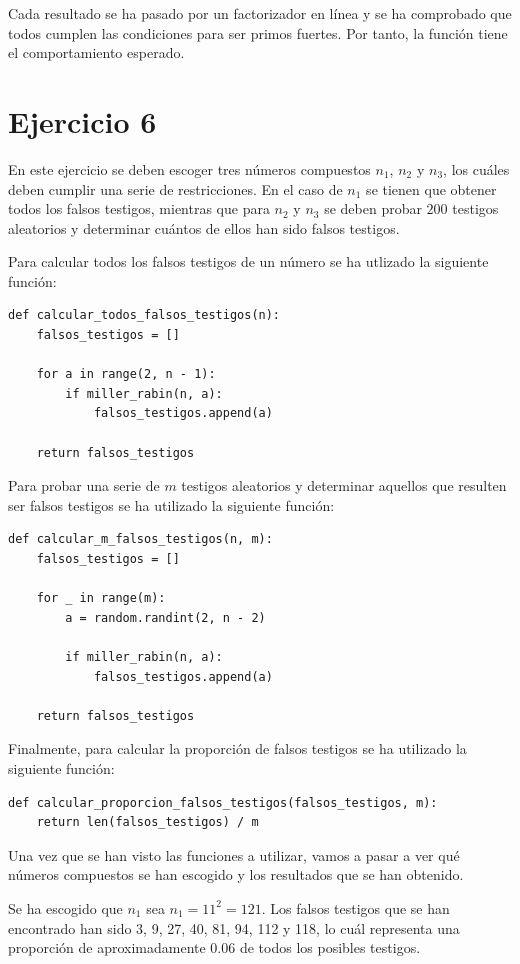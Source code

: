 \documentclass[11pt,a4paper]{article}
\newcommand{\nonumsection}[1]{\section*{#1}\addcontentsline{toc}{section}{#1}}
\begin{document}
Cada resultado se ha pasado por un factorizador en línea y se ha comprobado que todos cumplen
las condiciones para ser primos fuertes. Por tanto, la función tiene el comportamiento esperado. 

\nonumsection{Ejercicio 6}

En este ejercicio se deben escoger tres números compuestos $n_1$, $n_2$ y $n_3$, los cuáles
deben cumplir una serie de restricciones. En el caso de $n_1$ se tienen que obtener todos los
falsos testigos, mientras que para $n_2$ y $n_3$ se deben probar $200$ testigos aleatorios
y determinar cuántos de ellos han sido falsos testigos.

Para calcular todos los falsos testigos de un número se ha utlizado la siguiente
función:

\begin{lstlisting}
def calcular_todos_falsos_testigos(n):
    falsos_testigos = []

    for a in range(2, n - 1):
        if miller_rabin(n, a):
            falsos_testigos.append(a)
    
    return falsos_testigos
\end{lstlisting}

Para probar una serie de $m$ testigos aleatorios y determinar aquellos que resulten ser falsos
testigos se ha utilizado la siguiente función:

\begin{lstlisting}
def calcular_m_falsos_testigos(n, m):
    falsos_testigos = []

    for _ in range(m):
        a = random.randint(2, n - 2)

        if miller_rabin(n, a):
            falsos_testigos.append(a)

    return falsos_testigos
\end{lstlisting}

Finalmente, para calcular la proporción de falsos testigos se ha utilizado la siguiente
función:

\begin{lstlisting}
def calcular_proporcion_falsos_testigos(falsos_testigos, m):
    return len(falsos_testigos) / m
\end{lstlisting}

Una vez que se han visto las funciones a utilizar, vamos a pasar a ver qué números compuestos se
han escogido y los resultados que se han obtenido.

Se ha escogido que $n_1$ sea $n_1 = 11^2 = 121$. Los falsos testigos que se han encontrado han
sido 3, 9, 27, 40, 81, 94, 112 y 118, lo cuál representa una proporción de aproximadamente $0.06$
de todos los posibles testigos.
\end{document}
